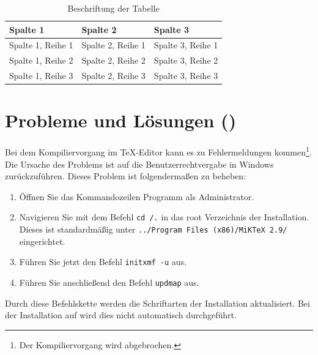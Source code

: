 \begin{table}[htb]
	\centering
	\caption{Beschriftung der Tabelle}
	\label{tab:label-der-tabelle}
	\begin{tabular}{lll}
		\toprule
		Spalte 1 & Spalte 2 & Spalte 3 \\
		\midrule
		Spalte 1, Reihe 1 & Spalte 2, Reihe 1 & Spalte 3, Reihe 1 \\
		Spalte 1, Reihe 2 & Spalte 2, Reihe 2 & Spalte 3, Reihe 2 \\
		Spalte 1, Reihe 3 & Spalte 2, Reihe 3 & Spalte 3, Reihe 3 \\
		\bottomrule
	\end{tabular}
\end{table}

\section{Probleme und Lösungen ()}\label{sec:probleme-und-loesungen}

Bei dem Kompiliervorgang im \TeX-Editor kann es zu Fehlermeldungen kommen\footnote{Der Kompiliervorgang wird abgebrochen.}.
Die Ursache des Problems ist auf die Benutzerrechtvergabe in Windows zurückzuführen.
Dieses Problem ist folgendermaßen zu beheben:

\begin{enumerate}
	\item Öffnen Sie das Kommandozeilen Programm als Administrator.
	\item Navigieren Sie mit dem Befehl \verb|cd /.| in das root Verzeichnis der  Installation. Dieses ist standardmäßig unter \verb|../Program Files (x86)/MiKTeX 2.9/| eingerichtet.
	\item Führen Sie jetzt den Befehl \verb|initxmf -u| aus.
	\item Führen Sie anschließend den Befehl \verb|updmap| aus.
\end{enumerate}

Durch diese Befehlskette werden die Schriftarten der  Installation aktualisiert. Bei der Installation auf  wird dies nicht automatisch durchgeführt.

